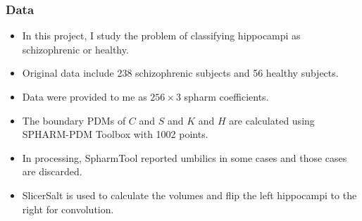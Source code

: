 \documentclass{beamer}
\begin{document}
\begin{frame}
\frametitle{Data}
\begin{itemize}
    \item In this project, I study the problem of classifying hippocampi as schizophrenic or healthy.
    \item Original data include 238 schizophrenic subjects and 56 healthy subjects.
    \item Data were provided to me as $256\times 3$ spharm coefficients.
    \item The boundary PDMs of $C$ and $S$ and $K$ and $H$ are calculated using SPHARM-PDM Toolbox with 1002 points.
    \item In processing, SpharmTool reported umbilics in some cases and those cases are discarded.
    \item SlicerSalt is used to calculate the volumes and flip the left hippocampi to the right for convolution.
\end{itemize}
\end{frame}
\end{document}
